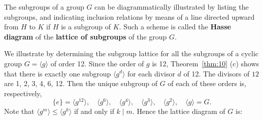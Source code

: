 \documentclass[12pt]{article}
\newcommand{\divides}{\ensuremath{\mid}}
\newcommand{\<}{\ensuremath{\langle}}
\renewcommand{\>}{\ensuremath{\rangle}}
\newcommand{\eye}{\ensuremath{e}}
\theoremstyle{plain}
\theoremstyle{definition}
\begin{document}
\newpage

\pagestyle{fancy} \lhead{\bf } 
\rhead{} \lfoot{} \cfoot{\thepage} \rfoot{}

The subgroups of a group $G$ can be diagrammatically  illustrated
by listing the subgroups, and indicating inclusion relations by
means of a line directed upward from $H$ to $K$ if $H$ is a
subgroup of $K$.  Such a scheme is called the {\bf Hasse diagram} of the 
{\bf lattice of subgroups} of the group $G$.  

We illustrate by determining the subgroup lattice for all the subgroups of a
cyclic group $G=\langle g\rangle$ of order 12.  Since the order of
$g$ is 12, Theorem~\ref{thm:10} (c) shows that there is exactly one subgroup
$\langle g^d\rangle$ for each divisor $d$ of 12.  The divisors of
$12$ are 1, 2, 3, 4, 6, 12.  Then the unique subgroup of $G$ of
each of these orders is, respectively,
\[
\{\eye\}=\langle g^{12}\rangle,\quad \langle g^6\rangle, \quad
\langle g^4\rangle,\quad \langle g^3\rangle, \quad \langle
g^2\rangle , \quad \langle g\rangle = G.
\]
Note that $\langle g^m\rangle \leq \langle g^k\rangle$ if and only if $k\divides m$.
Hence the lattice diagram of $G$ is:

\begin{center}
\end{center}
\end{document}
